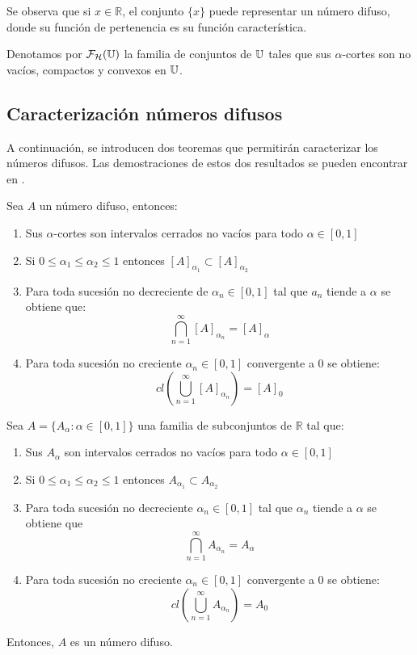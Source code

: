   Se observa que si $x \in \mathbb{R}$, el conjunto $\{x\}$ puede representar un número difuso, donde su función de pertenencia es su función característica.

  Denotamos por $\mathcal{F}_\mathcal{H}(\mathbb U)$ la familia de conjuntos de $\mathbb U$ tales que sus $\alpha$-cortes son no vacíos, compactos y convexos en $\mathbb U$.
  \subsection{Caracterización números difusos}
  A continuación, se introducen dos teoremas que permitirán caracterizar los números difusos. Las demostraciones de estos dos resultados se pueden encontrar en \cite{fuzzyintro}.

  \begin{teorema}
    Sea $A$ un número difuso, entonces:
    \begin{enumerate}
    \item Sus $\alpha$-cortes son intervalos cerrados no vacíos para todo $\alpha \in [0, 1]$
    \item Si $0 \leq \alpha_1 \leq \alpha_2 \leq 1$ entonces $[A]_{\alpha_1} \subset [A]_{\alpha_2}$
    \item Para toda sucesión no decreciente de $\alpha_n \in [0, 1]$ tal que $a_n$ tiende a $\alpha$ se obtiene que:
      \[
      \bigcap^\infty_{n=1} [A]_{\alpha_n} = [A]_\alpha
      \]
    \item Para toda sucesión no creciente $\alpha_n \in [0, 1]$ convergente a $0$ se obtiene:
      \[
      cl\left(
      \bigcup^\infty_{n=1} [A]_{\alpha_n} \right) = [A]_0
      \]
    \end{enumerate}
  \end{teorema}

  \begin{teorema}
    Sea $A=\{A_\alpha : \alpha \in [0, 1]\}$ una familia de subconjuntos de $\mathbb{R}$ tal que:
    
    \begin{enumerate}
    \item Sus $A_\alpha$ son intervalos cerrados no vacíos para todo $\alpha \in [0, 1]$
    \item Si $0 \leq \alpha_1 \leq \alpha_2 \leq 1$ entonces $A_{\alpha_1} \subset A_{\alpha_2}$
    \item Para toda sucesión no decreciente $\alpha_n \in [0, 1]$ tal que $\alpha_n$ tiende a $\alpha$ se obtiene que
      $$
      \bigcap^\infty_{n=1} A_{\alpha_n}=A_\alpha
      $$
    \item Para toda sucesión no creciente $\alpha_n \in [0, 1]$ convergente a $0$ se obtiene:
      $$
      cl\left(\bigcup^\infty_{n=1} A_{\alpha_n}\right)=A_0
      $$
    \end{enumerate}
    Entonces, $A$ es un número difuso.
  \end{teorema}


